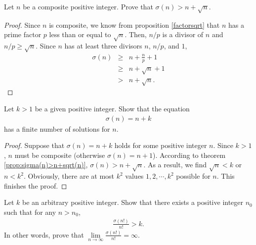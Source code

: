 \documentclass[12pt]{subfile}
\begin{document}
	\begin{proposition}\label{prop:sigma(n)>n+sqrt(n)}
		Let $n$ be a composite positive integer. Prove that $\sigma(n) > n + \sqrt n$.
	\end{proposition}

	\begin{proof}
		Since $n$ is composite, we know from proposition \ref{factorsqrt} that $n$ has a prime factor $p$ less than or equal to $\sqrt n$. Then, $n/p$ is a divisor of $n$ and $n/p \geq \sqrt n$. Since $n$ has at least three divisors $n$, $n/p$, and $1$,
			\begin{eqnarray*}
				\sigma(n) &\geq& n + \frac{n}{p} + 1\\
						  &\geq& n + \sqrt n + 1\\
						  &>& n+ \sqrt n.
			\end{eqnarray*}
	\end{proof}


	\begin{theorem}
		Let $k>1$ be a given positive integer. Show that the equation
			\begin{align*}
				\sigma(n) = n + k
			\end{align*}
		has a finite number of solutions for $n$.
	\end{theorem}

	\begin{proof}
		Suppose that $\sigma(n)=n+k$ holds for some positive integer $n$. Since $k>1$, $n$ must be composite (otherwise $\sigma(n)=n+1$). According to theorem \ref{prop:sigma(n)>n+sqrt(n)}, $\sigma(n) > n + \sqrt n$. As a result, we find $\sqrt n < k$ or $n < k^2$. Obviously, there are at most $k^2$ values $1,2,\cdots,k^2$ possible for $n$. This finishes the proof.
	\end{proof}


	\begin{theorem}
		Let $k$ be an arbitrary positive integer. Show that there exists a positive integer $n_0$ such that for any $n>n_0$,
			\begin{align*}
			\frac{\sigma(n!)}{n!} > k.
			\end{align*}
		In other words, prove that $\lim\limits_{n \to \infty} \frac{\sigma(n!)}{n!}= \infty$.
	\end{theorem}
\end{document}
